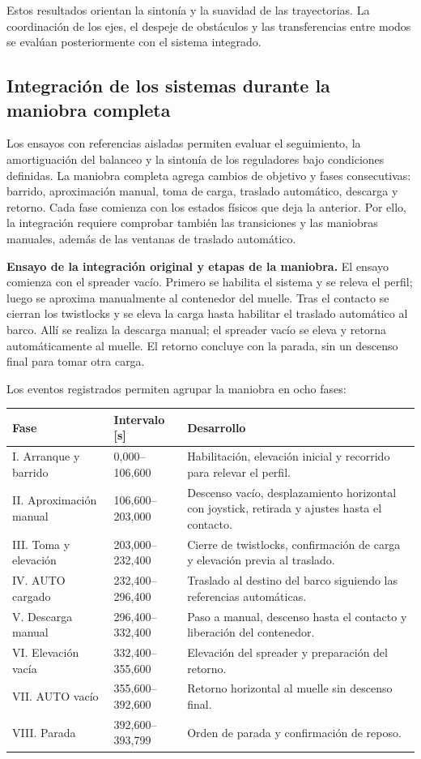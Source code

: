 \documentclass[a4paper,10pt,onecolumn,journal]{ieeeconf}
\numberwithin{equation}{section}
\begin{document}
Estos resultados orientan la sintonía y la suavidad de las trayectorias. La coordinación de los ejes, el despeje de obstáculos y las transferencias entre modos se evalúan posteriormente con el sistema integrado.

\subsection{Integración de los sistemas durante la maniobra completa}
Los ensayos con referencias aisladas permiten evaluar el seguimiento, la amortiguación del balanceo y la sintonía de los reguladores bajo condiciones definidas. La maniobra completa agrega cambios de objetivo y fases consecutivas: barrido, aproximación manual, toma de carga, traslado automático, descarga y retorno. Cada fase comienza con los estados físicos que deja la anterior. Por ello, la integración requiere comprobar también las transiciones y las maniobras manuales, además de las ventanas de traslado automático.

\textbf{Ensayo de la integración original y etapas de la maniobra.} El ensayo comienza con el spreader vacío. Primero se habilita el sistema y se releva el perfil; luego se aproxima manualmente al contenedor del muelle. Tras el contacto se cierran los twistlocks y se eleva la carga hasta habilitar el traslado automático al barco. Allí se realiza la descarga manual; el spreader vacío se eleva y retorna automáticamente al muelle. El retorno concluye con la parada, sin un descenso final para tomar otra carga.

Los eventos registrados permiten agrupar la maniobra en ocho fases:

\begin{table}[H]
\centering
{\small
\begin{tabular}{@{}L{0.25\textwidth}L{0.22\textwidth}L{0.45\textwidth}@{}}
\toprule
Fase & Intervalo [s] & Desarrollo\\
\midrule
I. Arranque y barrido & 0,000--106,600 & Habilitación, elevación inicial y recorrido para relevar el perfil.\\
II. Aproximación manual & 106,600--203,000 & Descenso vacío, desplazamiento horizontal con joystick, retirada y ajustes hasta el contacto.\\
III. Toma y elevación & 203,000--232,400 & Cierre de twistlocks, confirmación de carga y elevación previa al traslado.\\
IV. AUTO cargado & 232,400--296,400 & Traslado al destino del barco siguiendo las referencias automáticas.\\
V. Descarga manual & 296,400--332,400 & Paso a manual, descenso hasta el contacto y liberación del contenedor.\\
VI. Elevación vacía & 332,400--355,600 & Elevación del spreader y preparación del retorno.\\
VII. AUTO vacío & 355,600--392,600 & Retorno horizontal al muelle sin descenso final.\\
VIII. Parada & 392,600--393,799 & Orden de parada y confirmación de reposo.\\
\bottomrule
\end{tabular}
}
\end{table}
\end{document}
